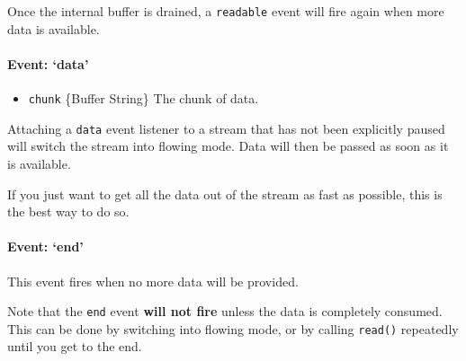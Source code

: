 \begin{Shaded}
\begin{Highlighting}[]
 
\NormalTok{(}\NormalTok{, }\NormalTok{() \{}
\NormalTok{\})}
\end{Highlighting}
\end{Shaded}

Once the internal buffer is drained, a \texttt{readable} event will fire
again when more data is available.

\paragraph{Event: `data'}

\begin{itemize}
\item
  \texttt{chunk} \{Buffer \textbar{} String\} The chunk of data.
\end{itemize}

Attaching a \texttt{data} event listener to a stream that has not been
explicitly paused will switch the stream into flowing mode. Data will
then be passed as soon as it is available.

If you just want to get all the data out of the stream as fast as
possible, this is the best way to do so.

\begin{Shaded}
\end{Shaded}

\paragraph{Event: `end'}

This event fires when no more data will be provided.

Note that the \texttt{end} event \textbf{will not fire} unless the data
is completely consumed. This can be done by switching into flowing mode,
or by calling \texttt{read()} repeatedly until you get to the end.

